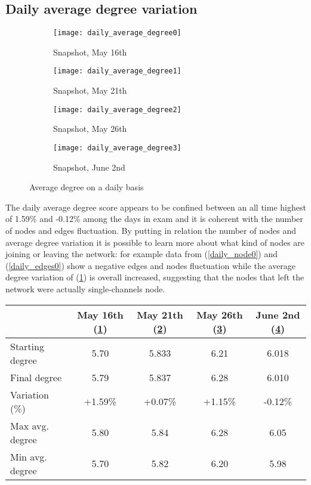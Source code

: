 	\subsection{Daily average degree variation}

	\begin{figure}[h]
	\centering
		\begin{subfigure}{0.45\textwidth}
			\centering
			\texttt{[image: daily\_average\_degree0]}
			\caption{Snapshot, May 16th}
			\label{daily_degree0}
		\end{subfigure}
		\begin{subfigure}{0.45\textwidth}
			\centering
			\texttt{[image: daily\_average\_degree1]}
			\caption{Snapshot, May 21th}
			\label{daily_degree1}
		\end{subfigure}
		\begin{subfigure}{0.45\textwidth}
			\centering
			\texttt{[image: daily\_average\_degree2]}
			\caption{Snapshot, May 26th}
			\label{daily_degree2}
		\end{subfigure}
		\begin{subfigure}{0.45\textwidth}
			\centering
			\texttt{[image: daily\_average\_degree3]}
			\caption{Snapshot, June 2nd}
			\label{daily_degree3}
		\end{subfigure}
	
	\caption{Average degree on a daily basis}
	\label{daily_degree _variation}
	\end{figure}

	The daily average degree score appears to be confined between an all time highest of 1.59\% and -0.12\% among the days in exam and it is coherent with the number of nodes and edges fluctuation. By putting in relation the number of nodes and average degree variation it is possible to learn more about what kind of nodes are joining or leaving the network: for example data from (\ref{daily_node0}) and (\ref{daily_edges0}) show a negative edges and nodes fluctuation while the average degree variation of (\ref{daily_degree0}) is overall increased, suggesting that the nodes that left the network were actually single-channels node.


	\begin{center}
		\begin{tabulary}{\linewidth}{| L | C | C | C | C |}
			\hline	
			& May 16th (\ref{daily_degree0}) & May 21th (\ref{daily_degree1}) & May 26th (\ref{daily_degree2}) & June 2nd (\ref{daily_degree3}) \\
			\hline
			Starting degree & 5.70 & 5.833 & 6.21  & 6.018 \\ \hline
			Final degree & 5.79 & 5.837 & 6.28 & 6.010 \\ \hline
			Variation (\%) & +1.59\% & +0.07\% & +1.15\% & -0.12\% \\ \hline
			Max avg. degree & 5.80 & 5.84 & 6.28 & 6.05 \\ \hline
			Min avg. degree & 5.70 & 5.82 & 6.20 & 5.98 \\ \hline		
		\end{tabulary}
	\end{center}
	
